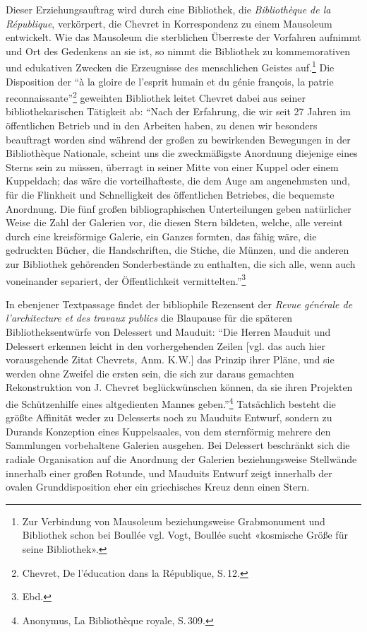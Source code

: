 Dieser Erziehungsauftrag wird durch eine Bibliothek, die
\emph{Bibliothèque de la République}, verkörpert, die Chevret in
Kor\-res\-pon\-denz zu einem Mausoleum entwickelt. Wie das Mausoleum die
sterblichen Überreste der Vorfahren aufnimmt und Ort des Gedenkens an
sie ist, so nimmt die Bibliothek zu kommemorativen und edukativen
Zwecken die Erzeugnisse des menschlichen Geistes auf.\footnote{Zur
  Verbindung von Mausoleum beziehungsweise Grabmonument und Bibliothek schon bei
  Boullée vgl. Vogt, Boullée sucht «kosmische Größe für seine
  Bibliothek».} Die Disposition der \enquote{à la gloire de l'esprit
humain et du génie françois, la patrie reconnaissante}\footnote{Chevret,
  De l'éducation dans la République, S.\,12.} geweihten Bibliothek leitet
Chevret dabei aus seiner bibliothekarischen Tätigkeit ab: \enquote{Nach
der Erfahrung, die wir seit 27 Jahren im öffentlichen Betrieb und in den
Arbeiten haben, zu denen wir besonders beauftragt worden sind während
der großen zu bewirkenden Bewegungen in der Bibliothèque Nationale,
scheint uns die zweckmäßigste Anordnung diejenige eines Sterns sein zu
müssen, überragt in seiner Mitte von einer Kuppel oder einem Kuppeldach;
das wäre die vorteilhafteste, die dem Auge am angenehmsten und, für die
Flinkheit und Schnelligkeit des öffentlichen Betriebes, die bequemste
Anordnung. Die fünf großen bibliographischen Unterteilungen geben
natürlicher Weise die Zahl der Galerien vor, die diesen Stern bildeten,
welche, alle vereint durch eine kreisförmige Galerie, ein Ganzes
formten, das fähig wäre, die gedruckten Bücher, die Handschriften, die
Stiche, die Münzen, und die anderen zur Bibliothek gehörenden
Sonderbestände zu enthalten, die sich alle, wenn auch voneinander
separiert, der Öffentlichkeit vermittelten.}\footnote{Ebd.}

In ebenjener Textpassage findet der bibliophile Rezensent der
\emph{Revue générale de l'architecture et des travaux publics} die
Blaupause für die späteren Bibliotheksentwürfe von Delessert und
Mauduit: \enquote{Die Herren Mauduit und Delessert erkennen leicht in
den vorhergehenden Zeilen {[}vgl. das auch hier vorausgehende Zitat
Chevrets, Anm. K.W.{]} das Prinzip ihrer Pläne, und sie werden ohne
Zweifel die ersten sein, die sich zur daraus gemachten Rekonstruktion
von J. Chevret beglückwünschen können, da sie ihren Projekten die
Schützenhilfe eines altgedienten Mannes geben.}\footnote{Anonymus, La
  Bibliothèque royale, S.\,309.} Tatsächlich besteht die größte Affinität
weder zu Delesserts noch zu Mauduits Entwurf, sondern zu Durands
Konzeption eines Kuppelsaales, von dem sternförmig mehrere den
Sammlungen vorbehaltene Galerien ausgehen. Bei Delessert beschränkt sich
die radiale Organisation auf die Anordnung der Galerien beziehungsweise
Stellwände innerhalb einer großen Rotunde, und Mauduits Entwurf zeigt
innerhalb der ovalen Grunddisposition eher ein griechisches Kreuz denn
einen Stern.

